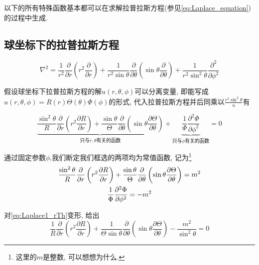 以下的所有特殊函数基本都可以在求解拉普拉斯方程(参见\cref{eq:Laplace_equation})的过程中生成.

\subsection{球坐标下的拉普拉斯方程}
\begin{theorem}[球坐标系下的拉普拉斯算子]
    \begin{equation}
        \nabla^2 = \frac{1}{r^2}\frac{\partial}{\partial r}\left( r^2\frac{\partial}{\partial r} \right) +\frac{1}{r^2\sin \theta}\frac{\partial}{\partial \theta}\left( \sin \theta \frac{\partial}{\partial \theta} \right) +\frac{1}{r^2\sin ^2\theta}\frac{\partial ^2}{\partial \phi ^2}
    \end{equation}
\end{theorem}

假设球坐标下拉普拉斯方程的解$u(r,\theta,\phi)$可以分离变量, 即能写成$u(r,\theta,\phi)=R(r)\Theta(\theta)\Phi(\phi)$的形式, 代入拉普拉斯方程并后同乘以$\frac{r^2\sin^2 \theta}{u}$有

\begin{equation}
    \underset{\text{只与}r,\theta\text{有关的函数}}{\underbrace{\boxed{\frac{\sin ^2\theta}{R}\frac{\partial}{\partial r}\left( r^2\frac{\partial R}{\partial r} \right) +\frac{\sin \theta}{\Theta}\frac{\partial}{\partial \theta}\left( \sin \theta \frac{\partial \Theta}{\partial \theta} \right) }}}+\underset{\text{只与}\phi\text{有关的函数}}{\underbrace{\boxed{\frac{1}{\Phi}\frac{\partial ^2\Phi}{\partial \phi ^2}}}}=0\label{eq:Laplace1_Origin}
\end{equation}

通过固定参数$\phi$,我们断定我们框选的两项均为常值函数, 记为\footnote{这里的$m$是整数, 可以想想为什么.}
\begin{gather}
        \frac{\sin ^2\theta}{R}\frac{\partial}{\partial r}\left( r^2\frac{\partial R}{\partial r} \right) +\frac{\sin \theta}{\Theta}\frac{\partial}{\partial \theta}\left( \sin \theta \frac{\partial \Theta}{\partial \theta} \right) =m^2\label{eq:Laplace1_rTh}\\
        \frac{1}{\Phi}\frac{\partial ^2\Phi}{\partial \phi ^2}=-m^2\notag
\end{gather}

对\cref{eq:Laplace1_rTh}变形, 给出
\begin{equation}
    \frac{1}{R}\frac{\partial}{\partial r}\left( r^2\frac{\partial R}{\partial r} \right) +\frac{1}{\Theta\sin \theta}\frac{\partial}{\partial \theta}\left( \sin \theta \frac{\partial \Theta}{\partial \theta} \right) -\frac{m^2}{\sin^2 \theta}=0
\end{equation}

